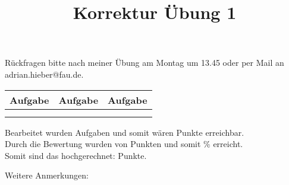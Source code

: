 \documentclass[11pt,a4paper]{article}
\title{Korrektur Übung 1}
\date{}
\begin{document}
\maketitle

\begin{center}
    Rückfragen bitte nach meiner Übung am Montag um 13.45 oder per Mail an adrian.hieber@fau.de.
\end{center}

\vspace{2cm}

\begin{center}
    \begin{tabular}[h]{l|c|r}
    Aufgabe\qquad \qquad& Aufgabe\qquad \qquad& Aufgabe\qquad \qquad\\
    \hline
      &   &   \\
      & & \\
    \end{tabular}
\end{center}

\vspace{1cm}

\begin{center}
Bearbeitet wurden Aufgaben \qquad \qquad \quad und somit wären \qquad \quad Punkte erreichbar.\\
\vspace{0.6cm}
Durch die Bewertung wurden \qquad \quad von \qquad \quad Punkten und somit \qquad \quad\% erreicht.\\
\vspace{0.6cm}
Somit sind das hochgerechnet: \qquad \quad Punkte.\\

\end{center}
\vspace{2cm}

Weitere Anmerkungen:
\end{document}
